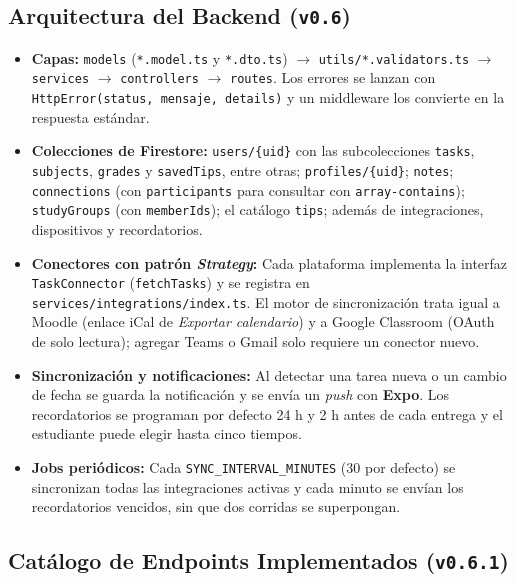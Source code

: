 \documentclass[11pt,letterpaper]{article}
\begin{document}
\subsection{Arquitectura del Backend (\texttt{v0.6})}
\begin{itemize}[leftmargin=1.5em, itemsep=2pt]
  \item \textbf{Capas:} \texttt{models} (\texttt{*.model.ts} y \texttt{*.dto.ts}) $\rightarrow$ \texttt{utils/*.validators.ts} $\rightarrow$ \texttt{services} $\rightarrow$ \texttt{controllers} $\rightarrow$ \texttt{routes}. Los errores se lanzan con \texttt{HttpError(status, mensaje, details)} y un middleware los convierte en la respuesta estándar.
  \item \textbf{Colecciones de Firestore:} \texttt{users/\{uid\}} con las subcolecciones \texttt{tasks}, \texttt{subjects}, \texttt{grades} y \texttt{savedTips}, entre otras; \texttt{profiles/\{uid\}}; \texttt{notes}; \texttt{connections} (con \texttt{participants} para consultar con \texttt{array-contains}); \texttt{studyGroups} (con \texttt{memberIds}); el catálogo \texttt{tips}; además de integraciones, dispositivos y recordatorios.
  \item \textbf{Conectores con patrón \emph{Strategy}:} Cada plataforma implementa la interfaz \texttt{TaskConnector} (\texttt{fetchTasks}) y se registra en \texttt{services/integrations/index.ts}. El motor de sincronización trata igual a Moodle (enlace iCal de \emph{Exportar calendario}) y a Google Classroom (OAuth de solo lectura); agregar Teams o Gmail solo requiere un conector nuevo.
  \item \textbf{Sincronización y notificaciones:} Al detectar una tarea nueva o un cambio de fecha se guarda la notificación y se envía un \emph{push} con \textbf{Expo}. Los recordatorios se programan por defecto 24 h y 2 h antes de cada entrega y el estudiante puede elegir hasta cinco tiempos.
  \item \textbf{Jobs periódicos:} Cada \texttt{SYNC\_INTERVAL\_MINUTES} (30 por defecto) se sincronizan todas las integraciones activas y cada minuto se envían los recordatorios vencidos, sin que dos corridas se superpongan.
\end{itemize}

\subsection{Catálogo de Endpoints Implementados (\texttt{v0.6.1})}
\end{document}
